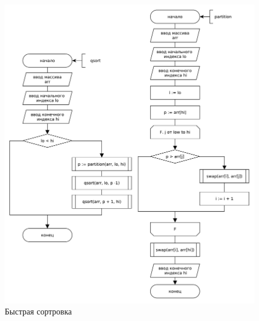 \begin{figure}[H]
    \centering
    \includegraphics[scale=0.65]{./pdf/qsort.pdf}
    \caption{Быстрая сортровка}
    \label{img:qs}
\end{figure}

